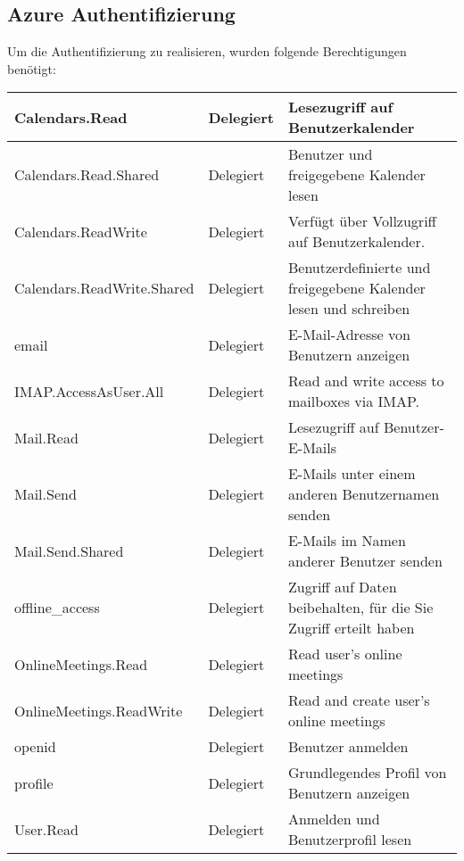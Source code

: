\subsection{Azure Authentifizierung}\label{subsec:Azure Authentifizierung}
Um die Authentifizierung zu realisieren, wurden folgende Berechtigungen benötigt:
\newline
\newline
    \centering
\small
    \begin{tabularx}{\textwidth}{|X|X|X|}
        \toprule
        \textbf{Calendars.Read} & \textbf{Delegiert} & \textbf{Lesezugriff auf Benutzerkalender}\\
        \hline
        Calendars.Read.Shared & Delegiert & Benutzer und freigegebene Kalender lesen\\
        \hline
        Calendars.ReadWrite & Delegiert & Verfügt über Vollzugriff auf Benutzerkalender.\\
        \hline
        Calendars.ReadWrite.Shared & Delegiert & Benutzerdefinierte und freigegebene Kalender lesen und schreiben\\
        \hline
        email & Delegiert & E-Mail-Adresse von Benutzern anzeigen \\
        \hline
        IMAP.AccessAsUser.All & Delegiert & Read and write access to mailboxes via IMAP.\\
        \hline
        Mail.Read & Delegiert & Lesezugriff auf Benutzer-E-Mails\\
        \hline
        Mail.Send & Delegiert & E-Mails unter einem anderen Benutzernamen senden\\
        \hline
        Mail.Send.Shared & Delegiert & E-Mails im Namen anderer Benutzer senden\\
        \hline
        offline\_access & Delegiert & Zugriff auf Daten beibehalten, für die Sie Zugriff erteilt haben\\
        \hline
        OnlineMeetings.Read & Delegiert & Read user's online meetings\\
        \hline
        OnlineMeetings.ReadWrite & Delegiert & Read and create user's online meetings\\
        \hline
        openid & Delegiert & Benutzer anmelden\\
        \hline
        profile & Delegiert & Grundlegendes Profil von Benutzern anzeigen\\
        \hline
        User.Read & Delegiert & Anmelden und Benutzerprofil lesen\\
        \bottomrule
    \end{tabularx}
